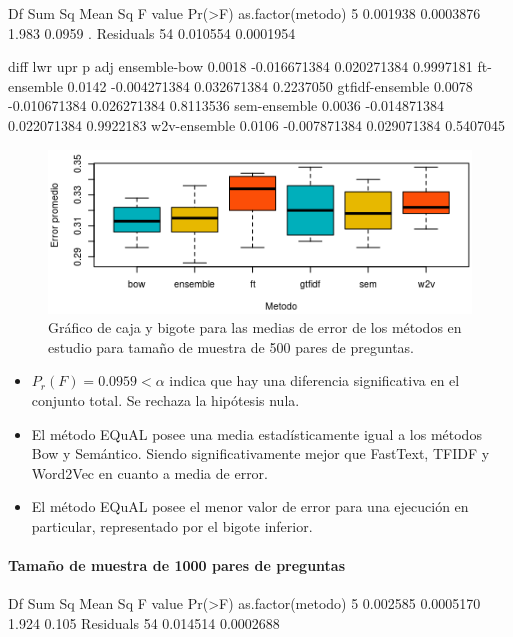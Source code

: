 \begin{rc}
                 Df   Sum Sq   Mean Sq F value Pr(>F)
as.factor(metodo)  5 0.001938 0.0003876   1.983 0.0959 .
Residuals         54 0.010554 0.0001954
\end{rc}

\begin{rc}
                  diff          lwr         upr     p adj
ensemble-bow     0.0018 -0.016671384 0.020271384 0.9997181
ft-ensemble      0.0142 -0.004271384 0.032671384 0.2237050
gtfidf-ensemble  0.0078 -0.010671384 0.026271384 0.8113536
sem-ensemble     0.0036 -0.014871384 0.022071384 0.9922183
w2v-ensemble     0.0106 -0.007871384 0.029071384 0.5407045
\end{rc}

\begin{figure}
	\centering
	\includegraphics[width=0.7\linewidth]{10_resultados/imagenes/anova_500}
	\caption{Gráfico de caja y bigote para las medias de error de los métodos en estudio para tamaño de muestra de 500 pares de preguntas.}
	\label{fig:anova500}
\end{figure}

\begin{itemize}
	\item \(P_r(F) = 0.0959 < \alpha\) indica que hay una diferencia significativa en el conjunto total. Se rechaza la hipótesis nula.
	\item El método EQuAL posee una media estadísticamente igual a los métodos Bow y Semántico. Siendo significativamente mejor que FastText, TFIDF y Word2Vec en cuanto a media de error.
	\item El método EQuAL posee el menor valor de error para una ejecución en particular, representado por el bigote inferior.
\end{itemize}

\paragraph{Tamaño de muestra de 1000 pares de preguntas}

\begin{rc}
                 Df   Sum Sq   Mean Sq F value Pr(>F)
as.factor(metodo)  5 0.002585 0.0005170   1.924  0.105
Residuals         54 0.014514 0.0002688
\end{rc}

